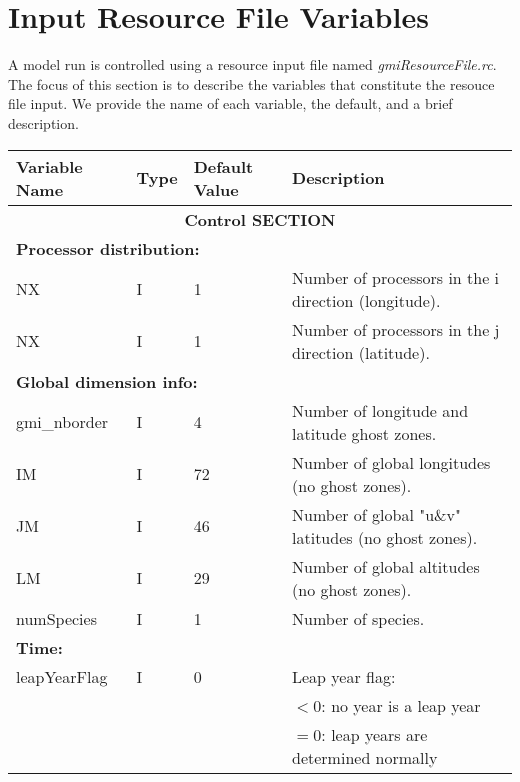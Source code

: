 \chapter[Input Resource File Variables]{Input Resource File Variables} 
\label{chap:rcFile}

A model run is controlled using a resource input file named
{\em gmiResourceFile.rc}.
The focus of this section is to describe the variables that constitute the 
resouce file input.
We provide the name of each variable, the default, and a brief description.


{\small

\begin{landscape}

\begin{center}
\begin{longtable}{|l|l|l|l|} \hline\hline
{\bf Variable Name} & {\bf Type} & {\bf Default Value} & {\bf Description} \\ \hline\hline
\multicolumn{4}{|c|}{\bf Control SECTION} \\ \hline\hline
\multicolumn{4}{|l|}{\bf Processor distribution:} \\ \hline
NX     & I  & 1          & Number of processors in the i direction (longitude). \\ \hline
NX     & I  & 1          & Number of processors in the j direction (latitude). \\ \hline
\multicolumn{4}{|l|}{\bf Global dimension info:} \\ \hline
gmi\_nborder & I    &  4     & Number of longitude and latitude ghost zones.   \\ \hline
%
IM         & I    & 72      & Number of global longitudes (no ghost zones).   \\ \hline
JM         & I    & 46      & Number of global "u\&v" latitudes (no ghost zones). \\ \hline
LM         & I    & 29      & Number of global altitudes (no ghost zones).  \\ \hline
%
numSpecies    & I    &  1         & Number of species.  \\ \hline
\multicolumn{4}{|l|}{\bf Time:} \\ \hline
leapYearFlag     & I    &    0      & Leap year flag:  \\
                 &      &           & $<0$: no year is a leap year  \\
                 &      &           & $=0$: leap years are determined normally  \\

\end{longtable}
\end{center}
\end{landscape}}
